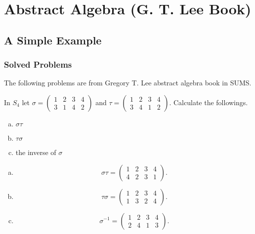 \chapter{Abstract Algebra (G. T. Lee Book)}

\section{A Simple Example}

\subsection{Solved Problems}
The following problems are from Gregory T. Lee abstract algebra book in SUMS.
\begin{problem}
	In $ S_4 $ let $ \sigma = \begin{pmatrix} 1 & 2 & 3 & 4 \\ 3 & 1 & 4 & 2 \end{pmatrix} $ and $ \tau  = \begin{pmatrix} 1 & 2 & 3 & 4 \\ 3 & 4 & 1 & 2 \end{pmatrix} $. Calculate the followings.
	\begin{enumerate}[(a)]
		\item $ \sigma \tau $
		\item $ \tau\sigma $
		\item the inverse of $ \sigma $
	\end{enumerate}
\end{problem}
\begin{solution}
	\begin{enumerate}[(a)]
		\item 
		\[ \sigma\tau = \begin{pmatrix} 1 & 2 & 3 & 4 \\ 4 & 2 & 3 & 1 \end{pmatrix}. \]
		\item 
		\[ \tau \sigma = \begin{pmatrix} 1 & 2 & 3 & 4 \\ 1 & 3 & 2 & 4 \end{pmatrix}. \]
		\item \[ \sigma^{-1} = \begin{pmatrix} 1 & 2 & 3 & 4 \\ 2 & 4 & 1 & 3 \end{pmatrix}. \]
	\end{enumerate}
\end{solution}


